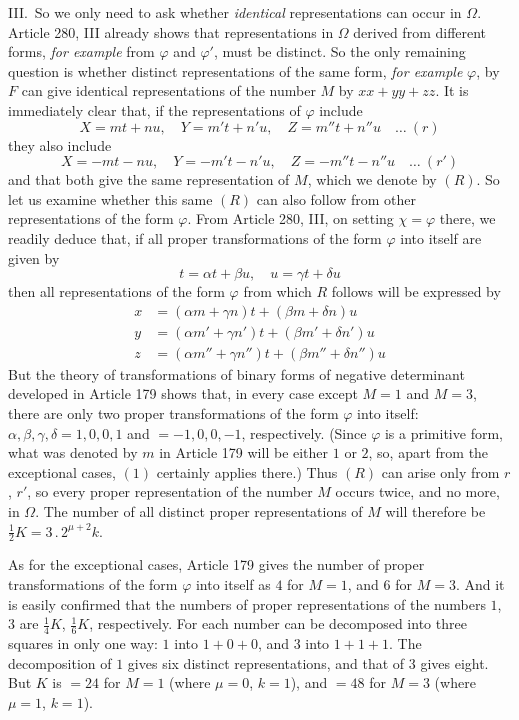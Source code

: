 III.\ So we only need to ask whether \textit{identical} representations
can occur in $\Omega$. Article 280, III already shows that representations
in $\Omega$ derived from different forms, \textit{for example} from
$\varphi$ and $\varphi'$, must be
distinct. So the only remaining question is whether distinct representations
of the same form, \textit{for example} $\varphi$, by $F$ can give
identical representations of the number $M$ by $xx+yy+zz$. It is
immediately clear that, if the representations of $\varphi$ include
\[
X=mt+nu,\quad Y=m't+n'u,\quad Z=m''t+n''u\quad\ldots\ (r)
\]
they also include
\[
X=-mt-nu,\quad Y=-m't-n'u,\quad Z=-m''t-n''u\quad\ldots\ (r')
\]
and that both give the same representation of $M$, which we
denote by $(R)$. So let us examine whether this same $(R)$ can
also follow from other representations of the form $\varphi$. From
Article 280, III, on setting $\chi=\varphi$ there, we readily deduce that,
if all proper transformations of the form $\varphi$ into itself are
given by
\[
t=\alpha t+\beta u,\quad u=\gamma t+\delta u
\]
then all representations of the form $\varphi$ from which $R$
follows will be expressed by
\[
\begin{aligned}
x&=(\alpha m+\gamma n)t+(\beta m+\delta n)u\\
y&=(\alpha m'+\gamma n')t+(\beta m'+\delta n')u\\
z&=(\alpha m''+\gamma n'')t+(\beta m''+\delta n'')u
\end{aligned}
\]
But the theory of transformations of binary forms of negative determinant
developed in Article 179 shows that, in every case except $M=1$
and $M=3$, there are only two proper transformations of the form
$\varphi$ into itself: $\alpha,\allowbreak \beta,\allowbreak \gamma,\allowbreak \delta=1,\allowbreak 0,\allowbreak 0,\allowbreak 1$ and $=-1,0,0,-1$, respectively. (Since
$\varphi$ is a primitive form, what was denoted by $m$ in Article
179 will be either $1$ or $2$, so, apart from the exceptional
cases, $(1)$ certainly applies there.) Thus $(R)$ can arise
only from $r$, $r'$, so every proper representation of the
number $M$ occurs twice, and no more, in $\Omega$. The number
of all distinct proper representations of $M$ will therefore
be $\tfrac{1}{2}K=3\,\allowbreak  .\,\allowbreak  2^{\mu+2}k$.

As for the exceptional cases, Article 179 gives the number of proper
transformations of the form $\varphi$ into itself as $4$ for $M=1$, and
$6$ for $M=3$. And it is easily confirmed that the numbers
of proper representations of the numbers $1$, $3$ are
$\tfrac{1}{4}K$, $\tfrac{1}{6}K$, respectively. For each number can be decomposed
into three
squares in only one way: $1$ into $1+0+0$, and $3$ into
$1+1+1$. The decomposition of $1$ gives six distinct representations,
and that of $3$ gives eight. But $K$ is $=24$ for $M=1$
(where $\mu=0$, $k=1$), and $=48$ for $M=3$ (where $\mu=1$,
$k=1$).


